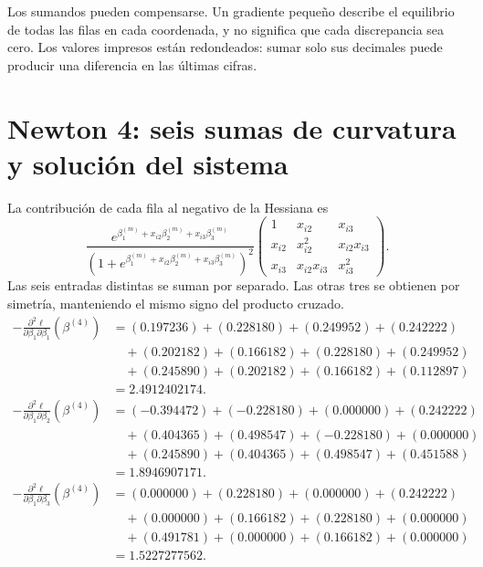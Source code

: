 \documentclass[11pt,a4paper]{article}
\begin{document}
Los sumandos pueden compensarse.
Un gradiente pequeño describe el equilibrio de todas las filas
en cada coordenada, y no significa que cada discrepancia sea cero.
Los valores impresos están redondeados: sumar solo sus decimales
puede producir una diferencia en las últimas cifras.

\clearpage
\section{Newton 4: seis sumas de curvatura y solución del sistema}\label{logit105}
\begingroup\small
\setlength{\abovedisplayskip}{3pt}\setlength{\belowdisplayskip}{3pt}
\setlength{\jot}{2pt}\setlength{\parskip}{3pt}
La contribución de cada fila al negativo de la Hessiana es
\[
\frac{e^{\beta_1^{(m)}+x_{i2}\beta_2^{(m)}+x_{i3}\beta_3^{(m)}}}
{(1+e^{\beta_1^{(m)}+x_{i2}\beta_2^{(m)}+x_{i3}\beta_3^{(m)}})^2}
\begin{pmatrix}
1&x_{i2}&x_{i3}\\
x_{i2}&x_{i2}^2&x_{i2}x_{i3}\\
x_{i3}&x_{i2}x_{i3}&x_{i3}^2
\end{pmatrix}.
\]
Las seis entradas distintas se suman por separado.
Las otras tres se obtienen por simetría, manteniendo el
mismo signo del producto cruzado.
\[
\begin{aligned}
-\frac{\partial^2\ell}{\partial\beta_1\partial\beta_1}(\beta^{(4)})&=(0.197236)+(0.228180)+(0.249952)+(0.242222)\\&\quad+(0.202182)+(0.166182)+(0.228180)+(0.249952)\\&\quad+(0.245890)+(0.202182)+(0.166182)+(0.112897)\\&=2.4912402174.\end{aligned}
\]
\[
\begin{aligned}
-\frac{\partial^2\ell}{\partial\beta_1\partial\beta_2}(\beta^{(4)})&=(-0.394472)+(-0.228180)+(0.000000)+(0.242222)\\&\quad+(0.404365)+(0.498547)+(-0.228180)+(0.000000)\\&\quad+(0.245890)+(0.404365)+(0.498547)+(0.451588)\\&=1.8946907171.\end{aligned}
\]
\[
\begin{aligned}
-\frac{\partial^2\ell}{\partial\beta_1\partial\beta_3}(\beta^{(4)})&=(0.000000)+(0.228180)+(0.000000)+(0.242222)\\&\quad+(0.000000)+(0.166182)+(0.228180)+(0.000000)\\&\quad+(0.491781)+(0.000000)+(0.166182)+(0.000000)\\&=1.5227277562.\end{aligned}
\]
\end{document}
